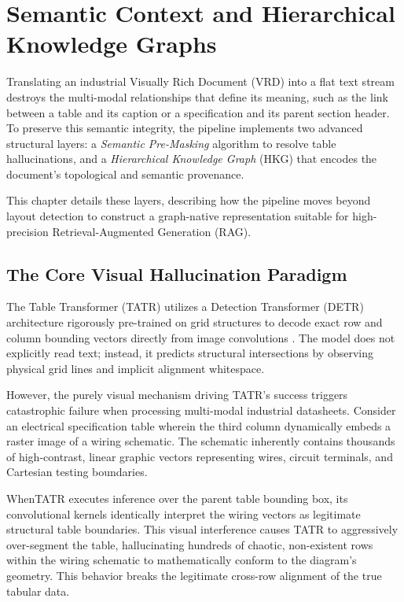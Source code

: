 \chapter{Semantic Context and Hierarchical Knowledge Graphs}
\label{ch:graph_masking}

Translating an industrial Visually Rich Document (VRD) into a flat text stream destroys the multi-modal relationships that define its meaning, such as the link between a table and its caption or a specification and its parent section header. To preserve this semantic integrity, the pipeline implements two advanced structural layers: a \textit{Semantic Pre-Masking} algorithm to resolve table hallucinations, and a \textit{Hierarchical Knowledge Graph} (HKG) that encodes the document's topological and semantic provenance.

This chapter details these layers, describing how the pipeline moves beyond layout detection to construct a graph-native representation suitable for high-precision Retrieval-Augmented Generation (RAG).

\section{The Core Visual Hallucination Paradigm}
\label{sec:hallucination_paradigm}

The Table Transformer (TATR) utilizes a Detection Transformer (DETR) architecture rigorously pre-trained on grid structures to decode exact row and column bounding vectors directly from image convolutions \citep{tatr}. The model does not explicitly read text; instead, it predicts structural intersections by observing physical grid lines and implicit alignment whitespace.

However, the purely visual mechanism driving TATR's success triggers catastrophic failure when processing multi-modal industrial datasheets. Consider an electrical specification table wherein the third column dynamically embeds a raster image of a wiring schematic. The schematic inherently contains thousands of high-contrast, linear graphic vectors representing wires, circuit terminals, and Cartesian testing boundaries.

WhenTATR executes inference over the parent table bounding box, its convolutional kernels identically interpret the wiring vectors as legitimate structural table boundaries. This visual interference causes TATR to aggressively over-segment the table, hallucinating hundreds of chaotic, non-existent rows within the wiring schematic to mathematically conform to the diagram's geometry. This behavior breaks the legitimate cross-row alignment of the true tabular data.

